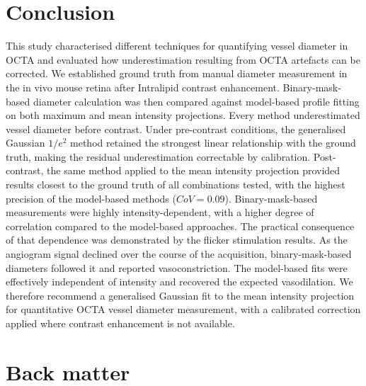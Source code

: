 \documentclass{optica-article}
\begin{document}
\section{Conclusion}
This study characterised different techniques for quantifying vessel diameter in OCTA and evaluated how underestimation resulting from OCTA artefacts can be corrected. We established ground truth  from manual diameter measurement in the in vivo mouse retina after Intralipid contrast enhancement. Binary-mask-based diameter calculation was then compared against model-based profile fitting on both maximum and mean intensity projections. Every method underestimated vessel diameter before contrast. Under pre-contrast conditions, the generalised Gaussian $1/e^2$ method retained the strongest linear relationship with the ground truth, making the residual underestimation correctable by calibration. Post-contrast, the same method applied to the mean intensity projection provided results closest to the ground truth of all combinations tested, with the highest precision of the model-based methods ($CoV = 0.09$). Binary-mask-based measurements were highly intensity-dependent, with a higher degree of correlation compared to the model-based approaches. The practical consequence of that dependence was demonstrated by the flicker stimulation results. As the angiogram signal declined over the course of the acquisition, binary-mask-based diameters followed it and reported vasoconstriction. The model-based fits were effectively independent of intensity and recovered the expected vasodilation. We therefore recommend a generalised Gaussian fit to the mean intensity projection for quantitative OCTA vessel diameter measurement, with a calibrated correction applied where contrast enhancement is not available.

\section{Back matter}
\end{document}
